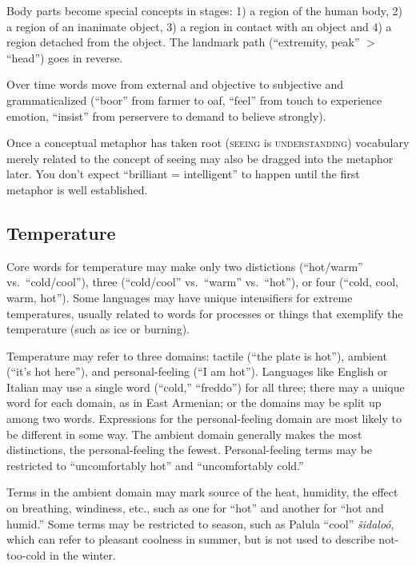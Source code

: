 \documentclass[11pt]{article}
\newcommand{\I}[1]{\textsc{#1}}   %
\begin{document}
Body parts become special concepts in stages: 1) a region of the human
body, 2) a region of an inanimate object, 3) a region in contact with
an object and 4) a region detached from the object.  The landmark path
(``extremity, peak'' $>$ ``head'') goes in reverse.

Over time words move from external and objective to subjective and
grammaticalized (``boor'' from farmer to oaf, ``feel'' from touch to
experience emotion, ``insist'' from perservere to demand to believe
strongly).

Once a conceptual metaphor has taken root (\I{seeing} is
\I{understanding}) vocabulary merely related to the concept of seeing
may also be dragged into the metaphor later.  You don't expect
``brilliant = intelligent'' to happen until the first metaphor is well
established.

\subsection{Temperature}
Core words for temperature may make only two distictions (``hot/warm''
vs.\ ``cold/cool''), three (``cold/cool'' vs.\ ``warm'' vs.\ ``hot''),
or four (``cold, cool, warm, hot''). Some languages may have unique
intensifiers for extreme temperatures, usually related to words for
processes or things that exemplify the temperature (such as ice or
burning).

Temperature may refer to three domains: tactile (``the plate is
hot''), ambient (``it's hot here''), and personal-feeling (``I am
hot''). Languages like English or Italian may use a single word
(``cold,'' ``freddo'') for all three; there may a unique word for each
domain, as in East Armenian; or the domains may be split up among two
words.  Expressions for the personal-feeling domain are most likely to
be different in some way.  The ambient domain generally makes the most
distinctions, the personal-feeling the fewest.  Personal-feeling terms
may be restricted to ``uncomfortably hot'' and ``uncomfortably cold.''

Terms in the ambient domain may mark source of the heat, humidity, the
effect on breathing, windiness, etc., such as one for ``hot'' and
another for ``hot and humid.''  Some terms may be restricted to
season, such as Palula ``cool'' \textit{šidaloó}, which can refer to
pleasant coolness in summer, but is not used to describe not-too-cold
in the winter.
\end{document}
